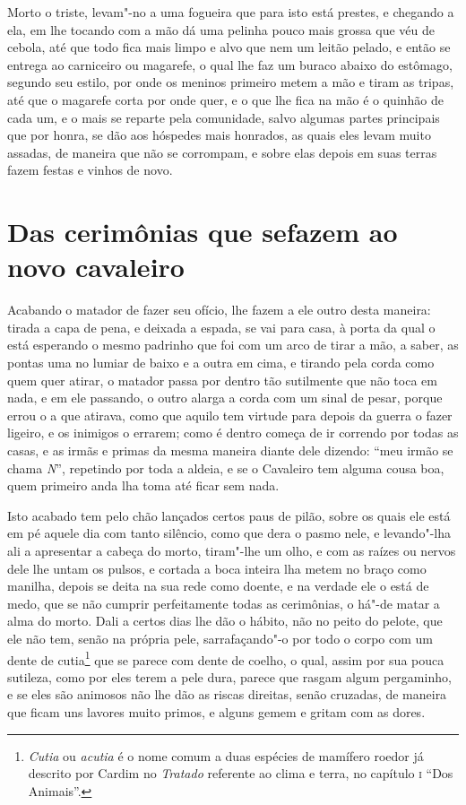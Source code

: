  Morto o triste, levam"-no a uma fogueira que para isto está prestes, e
chegando a ela, em lhe tocando com a mão dá uma pelinha pouco mais
grossa que véu de cebola, até que todo fica mais limpo e alvo que nem
um leitão pelado, e então se entrega ao carniceiro ou magarefe, o qual
lhe faz um buraco abaixo do estômago, segundo seu estilo, por onde os
meninos primeiro metem a mão e tiram as tripas, até que o magarefe
corta por onde quer, e o que lhe fica na mão é o quinhão de cada um, e
o mais se reparte pela comunidade, salvo algumas partes principais que
por honra, se dão aos hóspedes mais honrados, as quais eles levam muito
assadas, de maneira que não se corrompam, e sobre elas depois em suas
terras fazem festas e vinhos de novo. 

\section[Das cerimônias que se fazem ao novo cavaleiro]{Das cerimônias que se\break fazem ao novo cavaleiro} 
Acabando o matador de fazer seu ofício, lhe fazem a ele outro
desta maneira: tirada a capa de pena, e deixada a espada, se vai para
casa, à porta da qual o está esperando o mesmo padrinho que foi com um
arco de tirar a mão, a saber, as pontas uma no lumiar de baixo e a
outra em cima, e tirando pela corda como quem quer atirar, o matador
passa por dentro tão sutilmente que não toca em nada, e em ele
passando, o outro alarga a corda com um sinal de pesar, porque errou o
a que atirava, como que aquilo tem virtude para depois da guerra o
fazer ligeiro, e os inimigos o errarem; como é dentro começa de ir
correndo por todas as casas, e as irmãs e primas da mesma maneira
diante dele dizendo: ``meu irmão se chama \textit{N}'', repetindo por
toda a aldeia, e se o Cavaleiro tem alguma cousa boa, quem primeiro
anda lha toma até ficar sem nada. 

 Isto acabado tem pelo chão lançados certos paus de pilão, sobre os
quais ele está em pé aquele dia com tanto silêncio, como que dera o
pasmo nele, e levando"-lha ali a apresentar a cabeça do morto, tiram"-lhe
um olho, e com as raízes ou nervos dele lhe untam os pulsos, e cortada
a boca inteira lha metem no braço como manilha, depois se deita na sua
rede como doente, e na verdade ele o está de medo, que se não cumprir
perfeitamente todas as cerimônias, o há"-de matar a alma do morto. Dali
a certos dias lhe dão o hábito, não no peito do pelote, que ele não
tem, senão na própria pele, sarrafaçando"-o por todo o corpo com um
dente de cutia\footnote{ \textit{Cutia} ou \textit{acutia} é o nome
comum a duas espécies de mamífero roedor já descrito por Cardim no
\textit{Tratado} referente ao clima e terra, no capítulo \textsc{i} ``Dos
Animais''.} que se parece com dente de coelho, o qual, assim por sua
pouca sutileza, como por eles terem a pele dura, parece que rasgam
algum pergaminho, e se eles são animosos não lhe dão as riscas
direitas, senão cruzadas, de maneira que ficam uns lavores muito
primos, e alguns gemem e gritam com as dores.

